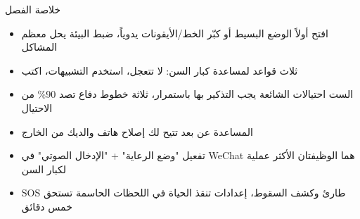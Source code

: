 \begin{tcbsummary}{خلاصة الفصل}
\begin{itemize}
  \item افتح أولاً الوضع البسيط أو كبّر الخط/الأيقونات يدوياً، ضبط البيئة يحل معظم المشاكل
  \item ثلاث قواعد لمساعدة كبار السن: لا تتعجل، استخدم التشبيهات، اكتب
  \item الست احتيالات الشائعة يجب التذكير بها باستمرار، ثلاثة خطوط دفاع تصد 90\% من الاحتيال
  \item المساعدة عن بعد تتيح لك إصلاح هاتف والديك من الخارج
  \item تفعيل "وضع الرعاية" + "الإدخال الصوتي" في WeChat هما الوظيفتان الأكثر عملية لكبار السن
  \item SOS طارئ وكشف السقوط، إعدادات تنقذ الحياة في اللحظات الحاسمة تستحق خمس دقائق
\end{itemize}

\end{tcbsummary}
